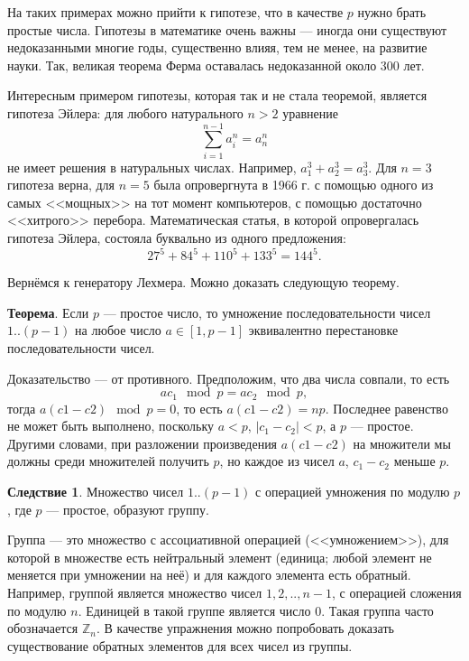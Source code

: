 \documentclass{book}
\begin{document}
На таких примерах можно прийти к гипотезе, что в качестве $p$ нужно брать
простые числа. Гипотезы в математике очень важны --- иногда они существуют недоказанными многие
годы, существенно влияя, тем не менее, на развитие науки. Так, великая теорема Ферма оставалась
недоказанной около 300 лет.

Интересным примером гипотезы, которая так и не стала теоремой, является гипотеза Эйлера: для любого
натурального $n > 2$ уравнение
\begin{equation}
    \sum_{i = 1}^{n - 1} a_i^n = a_n^n
\end{equation}
не имеет решения в натуральных числах. Например, $a_1^3 + a_2^3 = a_3^3$. Для $n = 3$ гипотеза
верна, для $n = 5$ была опровергнута в 1966 г. с помощью одного из самых <<мощных>> на тот момент
компьютеров, с помощью достаточно <<хитрого>> перебора. Математическая статья, в которой
опровергалась гипотеза Эйлера, состояла буквально из одного предложения:
\begin{equation}
    27^5 + 84^5 + 110^5 + 133^5 = 144^5.
\end{equation}

Вернёмся к генератору Лехмера. Можно доказать следующую теорему.

{\bf Теорема}. Если $p$ --- простое число, то умножение последовательности чисел $1..(p - 1)$ на
любое число $a \in [1, p - 1]$ эквивалентно перестановке последовательности чисел.

Доказательство --- от противного. Предположим, что два числа совпали, то есть
\begin{equation}
    a c_1 \mod p = a c_2 \mod p,
\end{equation}
тогда $a (c1 - c2) \mod p = 0 $, то есть $a (c1 - c2) = n p$.  Последнее равенство не может быть
выполнено, поскольку $a < p$, $|c_1 - c_2| < p$, а $p$ --- простое. Другими словами, при разложении
произведения $a (c1 - c2)$ на множители мы должны среди множителей получить $p$, но каждое из чисел
$a$, $c_1 - c_2$ меньше $p$.

{\bf Следствие 1}. Множество чисел $1..(p - 1)$ с операцией умножения по модулю $p$, где $p$ --- простое,
образуют группу.

Группа --- это множество с ассоциативной операцией (<<умножением>>), для которой в множестве есть
нейтральный элемент (единица; любой элемент не меняется при умножении на неё) и для каждого
элемента есть обратный. Например, группой является множество чисел $1, 2,.., n - 1$, с операцией
сложения по модулю $n$. Единицей в такой группе является число $0$. Такая группа часто обозначается
$\mathbb Z_n$. В качестве упражнения можно попробовать доказать существование обратных элементов
для всех чисел из группы.
\end{document}
